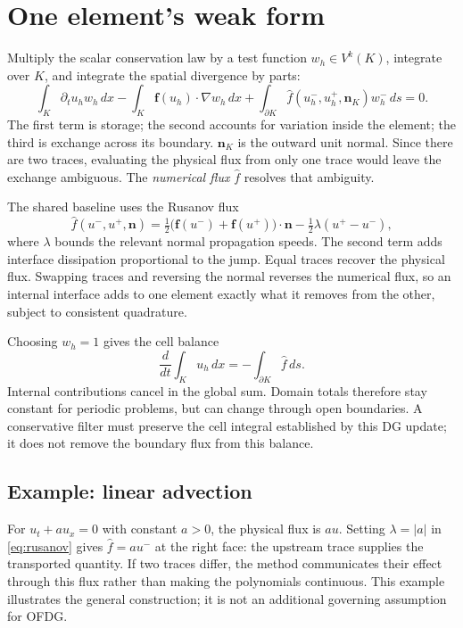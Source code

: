 \section{One element's weak form}
Multiply the scalar conservation law by a test function $w_h\in V^k(K)$,
integrate over $K$, and integrate the spatial divergence by parts:
\begin{equation}
 \int_K\partial_tu_h w_h\,dx
 -\int_K\boldsymbol f(u_h)\cdot\nabla w_h\,dx
 +\int_{\partial K}\widehat f(u_h^-,u_h^+,\boldsymbol n_K)w_h^-\,ds=0.
 \label{eq:rkdg-weak-form}
\end{equation}
The first term is storage; the second accounts for variation inside the element;
the third is exchange across its boundary. $\boldsymbol n_K$ is the outward
unit normal. Since there are two traces, evaluating the physical flux from
only one trace would leave the exchange ambiguous. The \emph{numerical flux}
$\widehat f$ resolves that ambiguity.

The shared baseline uses the Rusanov flux
\begin{equation}
 \widehat f(u^-,u^+,\boldsymbol n)
 =\tfrac12\bigl(\boldsymbol f(u^-)+\boldsymbol f(u^+)\bigr)\cdot\boldsymbol n
   -\tfrac12\lambda(u^+-u^-),
 \label{eq:rusanov}
\end{equation}
where $\lambda$ bounds the relevant normal propagation speeds. The second term
adds interface dissipation proportional to the jump. Equal traces recover the
physical flux. Swapping traces and reversing the normal reverses the numerical
flux, so an internal interface adds to one element exactly what it removes
from the other, subject to consistent quadrature.

Choosing $w_h=1$ gives the cell balance
\begin{equation}
 \frac{d}{dt}\int_K u_h\,dx
 =-\int_{\partial K}\widehat f\,ds.
 \label{eq:cell-balance}
\end{equation}
Internal contributions cancel in the global sum. Domain totals therefore stay
constant for periodic problems, but can change through open boundaries.
A conservative filter must preserve the cell integral established by this DG
update; it does not remove the boundary flux from this balance.

\subsection{Example: linear advection}
For $u_t+a u_x=0$ with constant $a>0$, the physical flux is $au$. Setting
$\lambda=|a|$ in \cref{eq:rusanov} gives $\widehat f=a u^-$ at the right face:
the upstream trace supplies the transported quantity. If two traces differ,
the method communicates their effect through this flux rather than making the
polynomials continuous. This example illustrates the general construction;
it is not an additional governing assumption for OFDG.

